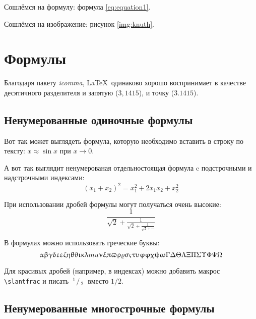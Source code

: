 Сошлёмся на формулу: формула \eqref{eq:equation1}.

Сошлёмся на изображение: рисунок \ref{img:knuth}.


\section{Формулы} \label{sect1_3}

Благодаря пакету \textit{icomma}, \LaTeX~одинаково хорошо воспринимает в качестве десятичного разделителя и запятую ($3,1415$), и точку ($3.1415$).

\subsection{Ненумерованные одиночные формулы} \label{subsect1_3_1}

Вот так может выглядеть формула, которую необходимо вставить в строку по тексту: $x \approx \sin x$ при $x \to 0$.

А вот так выглядит ненумерованая отдельностоящая формула c подстрочными и надстрочными индексами:
\[
(x_1+x_2)^2 = x_1^2 + 2 x_1 x_2 + x_2^2
\]

При использовании дробей формулы могут получаться очень высокие:
\[
  \frac{1}{\sqrt{2}+
  \displaystyle\frac{1}{\sqrt{2}+
  \displaystyle\frac{1}{\sqrt{2}+\cdots}}}
\]

В формулах можно использовать греческие буквы:
\[
\alpha\beta\gamma\delta\epsilon\varepsilon\zeta\eta\theta\vartheta\iota\kappa\lambda\\mu\nu\xi\pi\varpi\rho\varrho\sigma\varsigma\tau\upsilon\phi\varphi\chi\psi\omega\Gamma\Delta\Theta\Lambda\Xi\Pi\Sigma\Upsilon\Phi\Psi\Omega
\]

\def\slantfrac#1#2{ \hspace{3pt}\!^{#1}\!\!\hspace{1pt}/
  \hspace{2pt}\!\!_{#2}\!\hspace{3pt}
} %
Для красивых дробей (например, в индексах) можно добавить макрос
\verb+\slantfrac+ и писать $\slantfrac{1}{2}$ вместо $1/2$.

\subsection{Ненумерованные многострочные формулы} \label{subsect1_3_2}

